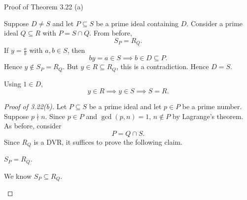 \documentclass[pmath441]{subfiles}
\begin{document}
\begin{boxyproof}{Proof of Theorem 3.22 (a)}
\begin{claim}
            Suppose $D\neq S$ and let $P\subseteq S$ be a prime ideal containing $D$. Consider a prime ideal $Q\subseteq R$ with $P=S\cap Q$. From before,
            \begin{equation*}
                S_P = R_Q.
            \end{equation*}
            If $y=\frac{a}{b}$ with $a,b\in S$, then
            \begin{equation*}
                by = a\in S \implies b\in D\subseteq P.
            \end{equation*}
            Hence $y\notin S_P=R_Q$. But $y\in R\subseteq R_Q$, this is a contradiction. Hence $D=S$.
        \end{claim}

        Using $1\in D$,
        \begin{equation*}
            y\in R\implies y\in S \implies S=R.
        \end{equation*}
        \qedplacedtrue
    \end{boxyproof}

    \begin{proof}[Proof of 3.22(b)]
        Let $P\subseteq S$ be a prime ideal and let $p\in P$ be a prime number. Suppose $p\nmid n$.  Since $p\in P$ and $\gcd\left( p,n \right) = 1$, $n\notin P$ by Lagrange's theorem. As before, consider
        \begin{equation*}
            P = Q\cap S.
        \end{equation*}
        Since $R_Q$ is a DVR, it suffices to prove the following claim.

        \begin{claim}
            \textit{$S_P=R_Q$.}

            We know $S_P\subseteq R_Q$.
        \end{claim}
    \end{proof}
    
    
    
    
    
    
    
    
    
    
    
    
    
    
    
    
    
    
    
    
    
    
    
    
    
    
    
    
    
    
    
    
    
    
    
    
    
    
\end{document}
